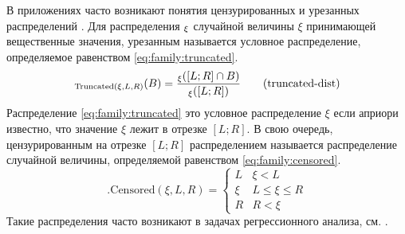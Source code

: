 В приложениях часто возникают понятия цензурированных и урезанных распределений \cite{famoye1995continuous}. Для распределения $\P_{\xi}$ случайной величины $\xi$ принимающей вещественные значения, урезанным называется условное распределение, определяемое равенством \eqref{eq:family:truncated}. 
\begin{equation}
    \label{eq:family:truncated}
    \P_{\mathrm{Truncated}(\xi, L,R)}(B)=\frac{\P_{\xi}([L; R] \cap B)}{\P_{\xi}([L; R])} \tag{truncated-dist}
\end{equation}
Распределение \eqref{eq:family:truncated} это условное распределение $\xi$ если априори известно, что значение $\xi$ лежит в отрезке $[L; R]$. В свою очередь, цензурированным на отрезке $[L; R]$ распределением называется распределение случайной величины, определяемой равенством \eqref{eq:family:censored}. 
\begin{equation}
    \label{eq:family:censored}. 
    \mathrm{Censored}(\xi, L,R)=\begin{cases}
        L  & \xi < L \\
        \xi & L \leq \xi \leq R \\
        R & R < \xi 
    \end{cases} \tag{censored-dist}
\end{equation}
Такие распределения часто возникают в задачах регрессионного анализа, см{.} \cite{breen1996regression}.

